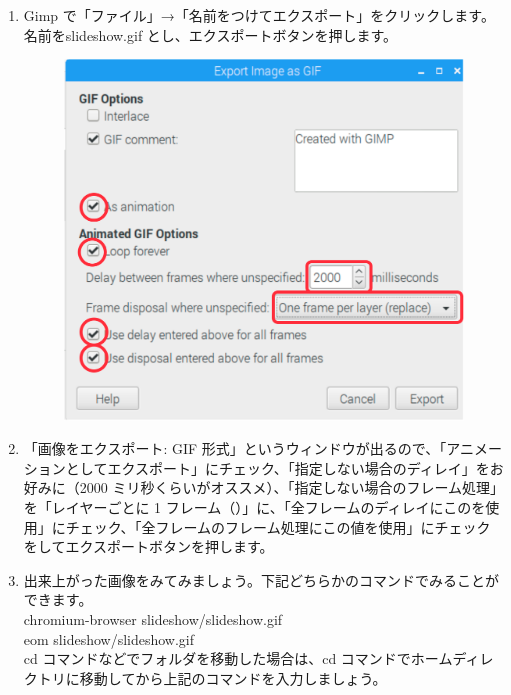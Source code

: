 \begin{enumerate}
\item Gimp で「ファイル」→「名前をつけてエクスポート」をクリックします。名前をslideshow.gif とし、エクスポートボタンを押します。
\begin{figure}[H]
    \centering
    \includegraphics[width=0.6\linewidth]{images/chap03/text03-img026.png}
\end{figure}
\item 「画像をエクスポート: GIF 形式」というウィンドウが出るので、「アニメーションとしてエクスポート」にチェック、「指定しない場合のディレイ」をお好みに（2000 ミリ秒くらいがオススメ）、「指定しない場合のフレーム処理」を「レイヤーごとに 1 フレーム（）」に、「全フレームのディレイにこのを使用」にチェック、「全フレームのフレーム処理にこの値を使用」にチェックをしてエクスポートボタンを押します。\\
\item 出来上がった画像をみてみましょう。下記どちらかのコマンドでみることができます。\\
chromium-browser slideshow/slideshow.gif\\
eom slideshow/slideshow.gif\\
cd コマンドなどでフォルダを移動した場合は、cd コマンドでホームディレクトリに移動してから上記のコマンドを入力しましょう。
\end{enumerate}

\begin{tcolorbox}[title=\useOmetoi]
\begin{enumerate}
\end{enumerate}
\end{tcolorbox}

